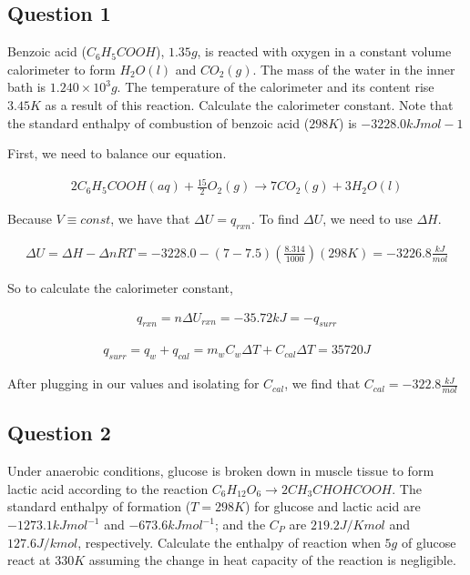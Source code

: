 \documentclass[12pt]{book}
\begin{document}
\subsection*{Question 1}

Benzoic acid ($C_6H_5COOH$), $1.35 g$, is reacted with oxygen in a constant volume calorimeter to form
$H_2O(l)$ and $CO_2(g)$. The mass of the water in the inner bath is $1.240\times 10^3 g$. The temperature of the
calorimeter and its content rise $3.45 K$ as a result of this reaction. Calculate the calorimeter constant.
Note that the standard enthalpy of combustion of benzoic acid ($298 K$) is $-3228.0 kJ mol-1$

First, we need to balance our equation.

\begin{align*}
    2C_6H_5COOH(aq)+\frac{15}{2}O_2(g)\rightarrow 7CO_2(g)+3H_2O(l)
\end{align*}

Because $V\equiv const$, we have that $\Delta U=q_{rxn}$. To find $\Delta U$, we need to use $\Delta H$.

\begin{align*}
    \Delta U=\Delta H-\Delta nRT=-3228.0-(7-7.5)\left(\frac{8.314}{1000}\right)(298K)=-3226.8 \frac{kJ}{mol}
\end{align*}

So to calculate the calorimeter constant, 

\begin{align*}
    q_{rxn}=n\Delta U_{rxn}=-35.72kJ=-q_{surr}
\end{align*}

\begin{align*}
    q_{surr}=q_w+q_{cal}=m_w C_w \Delta T+C_{cal}\Delta T=35720J
\end{align*}

After plugging in our values and isolating for $C_{cal}$, we find that $C_{cal}=-322.8\frac{kJ}{mol}$
\newpage
\subsection*{Question 2}

Under anaerobic conditions, glucose is broken down in muscle tissue to form lactic acid according to the reaction $C_6H_{12}O_6\rightarrow 2CH_3CHOHCOOH$.
The standard enthalpy of formation ($T = 298 K$) for glucose and lactic acid are $-1273.1 kJ mol^{-1}$ and $-673.6 kJ mol^{-1}$;
and the $C_P$ are $219.2 J/K mol$ and $127.6 J/k mol$, respectively. Calculate the enthalpy of reaction when $5 g$ of
glucose react at $330 K$ assuming the change in heat capacity of the reaction is negligible.
\end{document}
